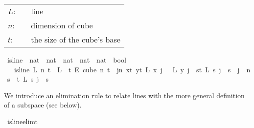 \begin{isabellebody}
\begin{isamarkuptext}
\begin{tabular}{llp{8cm}}
$L$:& \isa{nat\ {\isasymRightarrow}\ nat\ {\isasymRightarrow}\ nat}& line\\
$n$:& \isa{nat}& dimension of cube\\
$t$:& \isa{nat}& the size of the cube's base\\
\end{tabular}%
\end{isamarkuptext}\isamarkuptrue%
\isamarkupfalse%
\ is{\isacharunderscore}{\kern0pt}line\ {\isacharcolon}{\kern0pt}{\isacharcolon}{\kern0pt}\ {\isachardoublequoteopen}{\isacharparenleft}{\kern0pt}nat\ {\isasymRightarrow}\ {\isacharparenleft}{\kern0pt}nat\ {\isasymRightarrow}\ nat{\isacharparenright}{\kern0pt}{\isacharparenright}{\kern0pt}\ {\isasymRightarrow}\ nat\ {\isasymRightarrow}\ nat\ {\isasymRightarrow}\ bool{\isachardoublequoteclose}\isanewline
\ \ \ {\isachardoublequoteopen}is{\isacharunderscore}{\kern0pt}line\ L\ n\ t\ {\isasymequiv}\ {\isacharparenleft}{\kern0pt}L\ {\isasymin}\ {\isacharbraceleft}{\kern0pt}{\isachardot}{\kern0pt}{\isachardot}{\kern0pt}{\isacharless}{\kern0pt}t{\isacharbraceright}{\kern0pt}\ {\isasymrightarrow}\isactrlsub E\ cube\ n\ t\ {\isasymand}\ {\isacharparenleft}{\kern0pt}{\isacharparenleft}{\kern0pt}{\isasymforall}j{\isacharless}{\kern0pt}n{\isachardot}{\kern0pt}\ {\isacharparenleft}{\kern0pt}{\isasymforall}x{\isacharless}{\kern0pt}t{\isachardot}{\kern0pt}\ {\isasymforall}y{\isacharless}{\kern0pt}t{\isachardot}{\kern0pt}\ L\ x\ j\ {\isacharequal}{\kern0pt}\ \ L\ y\ j{\isacharparenright}{\kern0pt}\ {\isasymor}\ {\isacharparenleft}{\kern0pt}{\isasymforall}s{\isacharless}{\kern0pt}t{\isachardot}{\kern0pt}\ L\ s\ j\ {\isacharequal}{\kern0pt}\ s{\isacharparenright}{\kern0pt}{\isacharparenright}{\kern0pt}\ {\isasymand}\ {\isacharparenleft}{\kern0pt}{\isasymexists}j\ {\isacharless}{\kern0pt}\ n{\isachardot}{\kern0pt}\ {\isacharparenleft}{\kern0pt}{\isasymforall}s\ {\isacharless}{\kern0pt}\ t{\isachardot}{\kern0pt}\ L\ s\ j\ {\isacharequal}{\kern0pt}\ s{\isacharparenright}{\kern0pt}{\isacharparenright}{\kern0pt}{\isacharparenright}{\kern0pt}{\isacharparenright}{\kern0pt}{\isachardoublequoteclose}%
\begin{isamarkuptext}%
We introduce an elimination rule to relate lines with the more general definition of a subspace (see below).%
\end{isamarkuptext}\isamarkuptrue%
\isamarkupfalse%
\ is{\isacharunderscore}{\kern0pt}line{\isacharunderscore}{\kern0pt}elim{\isacharunderscore}{\kern0pt}t{\isacharunderscore}{\kern0pt}{}{\isacharcolon}{\kern0pt}\isanewline

\end{isabellebody}
